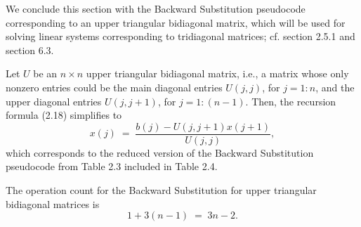 We conclude this section with the Backward Substitution pseudocode
corresponding to an upper triangular bidiagonal matrix, which will be
used for solving linear systems corresponding to tridiagonal matrices;
cf. section 2.5.1 and section 6.3.

Let $U$ be an $n \times n$ upper triangular bidiagonal matrix, i.e., a
matrix whose only nonzero entries could be the main diagonal entries
$U(j,j)$, for $j = 1:n$, and the upper diagonal entries $U(j,j+1)$, for
$j = 1:(n-1)$. Then, the recursion formula (2.18) simplifies to
\[
x(j) \;=\; \frac{b(j) - U(j,j+1)x(j+1)}{U(j,j)},
\]
which corresponds to the reduced version of the Backward Substitution
pseudocode from Table 2.3 included in Table 2.4.

The operation count for the Backward Substitution for upper triangular
bidiagonal matrices is
\begin{equation}
1 + 3(n-1) \;=\; 3n - 2.
\end{equation}
